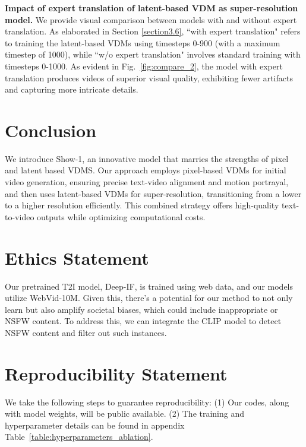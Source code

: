 \documentclass{article} \usepackage{iclr2024_conference,times}
\begin{document}
\noindent\textbf{Impact of expert translation of latent-based VDM as super-resolution model.} We provide visual comparison between models with and without expert translation. As elaborated in Section \ref{section3.6}, ``with expert translation" refers to training the latent-based VDMs using timesteps 0-900 (with a maximum timestep of 1000), while ``w/o expert translation" involves standard training with timesteps 0-1000. As evident in Fig.~\ref{fig:compare_2}, the model with expert translation produces videos of superior visual quality, exhibiting fewer artifacts and capturing more intricate details.
\vspace{-3mm}

\section{Conclusion}



We introduce Show-1, an innovative model that marries the strengths of pixel 
 and latent based VDMS. Our approach employs pixel-based VDMs for initial video generation, ensuring precise text-video alignment and motion portrayal, and then uses latent-based VDMs for super-resolution, transitioning from a lower to a higher resolution efficiently. This combined strategy offers high-quality text-to-video outputs while optimizing computational costs.





\section{ Ethics Statement }
Our pretrained T2I model, Deep-IF, is trained using web data, and our models utilize WebVid-10M. Given this, there's a potential for our method to not only learn but also amplify societal biases, which could include inappropriate or NSFW content. To address this, we can integrate the CLIP model to detect NSFW content and filter out such instances.
\section{Reproducibility Statement}
We take the following steps to guarantee reproducibility: (1) Our codes, along with model weights, will be public available. (2) The training and hyperparameter details can be found in appendix Table~\ref{table:hyperparameters_ablation}.




\end{document}
